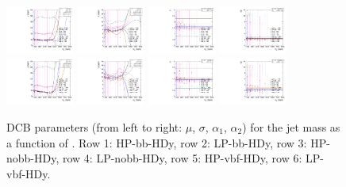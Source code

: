\begin{figure}[htbp]
  \includegraphics[width=0.2\textwidth]{fig/analysis/paramSignalShape_allSig_MJJ_HP_vbf_DEtaHi_mean.pdf}
  \includegraphics[width=0.2\textwidth]{fig/analysis/paramSignalShape_allSig_MJJ_HP_vbf_DEtaHi_sigma.pdf}
  \includegraphics[width=0.2\textwidth]{fig/analysis/paramSignalShape_allSig_MJJ_HP_vbf_DEtaHi_alpha.pdf}
  \includegraphics[width=0.2\textwidth]{fig/analysis/paramSignalShape_allSig_MJJ_HP_vbf_DEtaHi_alpha2.pdf}\\
  \includegraphics[width=0.2\textwidth]{fig/analysis/paramSignalShape_allSig_MJJ_LP_vbf_DEtaHi_mean.pdf}
  \includegraphics[width=0.2\textwidth]{fig/analysis/paramSignalShape_allSig_MJJ_LP_vbf_DEtaHi_sigma.pdf}
  \includegraphics[width=0.2\textwidth]{fig/analysis/paramSignalShape_allSig_MJJ_LP_vbf_DEtaHi_alpha.pdf}
  \includegraphics[width=0.2\textwidth]{fig/analysis/paramSignalShape_allSig_MJJ_LP_vbf_DEtaHi_alpha2.pdf}\\
  \caption{
    DCB parameters (from left to right: $\mu$, $\sigma$, $\alpha_1$, $\alpha_2$) for the jet mass \MJ as a function of \MX.
    Row 1: HP-bb-HDy, row 2: LP-bb-HDy, row 3: HP-nobb-HDy, row 4: LP-nobb-HDy, row 5: HP-vbf-HDy, row 6: LP-vbf-HDy.
  }
  \label{fig:MJJShapeParam_HDy_Run2}
\end{figure}

